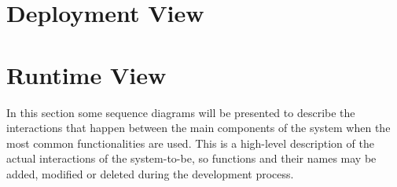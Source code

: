 %
%
\section{Deployment View}
%
%
\section{Runtime View}
In this section some sequence diagrams will be presented to describe the interactions that happen between the main components of the system when the most common functionalities are used. This is a high-level description of the actual interactions of the system-to-be, so functions and their names may be added, modified or deleted during the development process.

\pagebreak
\begin{landscape}
\begin{center}
\thispagestyle{empty}
\end{center}
\end{landscape}

\pagebreak
\begin{landscape}
\begin{center}
\thispagestyle{empty}
\end{center}
\end{landscape}

